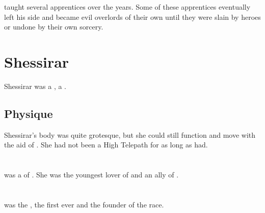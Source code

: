 \Sartheron taught several apprentices over the years.
Some of these apprentices eventually left his side and became evil overlords of their own until they were slain by heroes or undone by their own sorcery. 















\section{Shessirar}
Shessirar was a  \resvil, a . 









\subsection{Physique}
Shessirar's body was quite grotesque, but she could still function and move with the aid of \shapen. 
She had not been a High Telepath for as long as  had. 















\section{\Shiin}
\index{\Shiin}
\Shiin was a \resvil of \Baelzerach.
She was the youngest lover of  and an ally of \QuessanthIshnaruchaefir. 
















\section[Thanatzil]{\Thanatzil}
\index{\Thanatzil}
\Thanatzil{} was the \banemessiah, the first \resphan{} ever and the founder of the \resphan{} race. 

